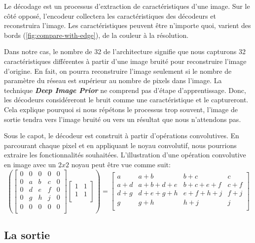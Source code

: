 \documentclass[
  11pt,
  dvipsnames]{article}
\begin{document}
Le décodage est un processus d'extraction de caractéristiques d'une image.
Sur le côté opposé, l'encodeur collectera les caractéristiques des décodeurs
et reconstruira l'image. Les caractéristiques peuvent être n'importe quoi,
varient des bords (\ref{fig:compare-with-edge}), de la couleur à la résolution.

Dans notre cas, le nombre de 32 de l'architecture signifie que nous capturons 32
caractéristiques différentes à partir d'une image bruité pour reconstruire
l'image d'origine. En fait, on pourra reconstruire l'image seulement si le nombre
de paramètre du réseau est supérieur au nombre de pixels dans l'image. La technique
\textbf{\emph{Deep Image Prior}} ne comprend pas d'étape d'apprentissage. Donc, les décodeurs
considéreront le bruit comme une caractéristique et le captureront.
Cela explique pourquoi si nous répétons le processus trop souvent, l'image de
sortie tendra vers l'image bruité ou vers un résultat que nous n'attendons pas.

Sous le capot, le décodeur est construit à partir d'opérations convolutives.
En parcourant chaque pixel et en appliquant le noyau convolutif, nous pourrions extraire les fonctionnalités souhaitées. L'illustration d'une opération convolutive en image avec un \(2 x 2\) noyau peut être vue comme suit:
\[\left(\begin{bmatrix}
  0 & 0 & 0 & 0 & 0\\
  0 & a & b & c & 0\\
  0 & d & e & f & 0\\
  0 & g & h & j & 0\\
  0 & 0 & 0 & 0 & 0\\
\end{bmatrix}
\begin{bmatrix}
  1 & 1\\
  1 & 1\\
\end{bmatrix}\right) =
\begin{bmatrix}
  a & a+b & b+c & c\\
  a+d & a+b+d+e & b+c+e+f & c+f\\
  d+g & d+e+g+h & e+f+h+j & f+j\\
  g & g+h & h+j & j\\
\end{bmatrix}
\]

\hypertarget{la-sortie}{%
\subsection{La sortie}\label{la-sortie}}
\end{document}
